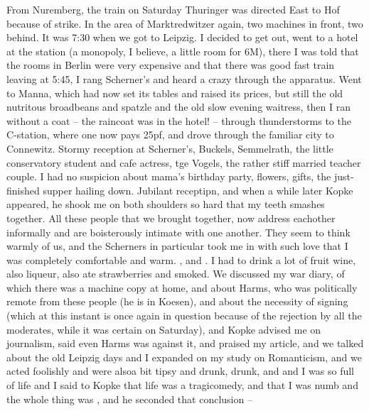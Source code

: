 From Nuremberg, the train on Saturday Thuringer was directed East to Hof because of strike. In the area of Marktredwitzer  again, two machines in front, two behind. It was 7:30 when we got to Leipzig. I decided to get out, went to a hotel at the station (a monopoly, I believe, a little room for 6M), there I was told that the rooms in Berlin were very expensive and that there was good fast train leaving at 5:45, I rang Scherner's and heard a crazy  through the apparatus. Went to Manna, which had now set its tables and raised its prices, but still the old nutritous broadbeans and spatzle and the old slow evening waitress, then I ran without a coat -- the raincoat was in the hotel! -- through thunderstorms to the C-station, where one now pays 25pf, and drove through the familiar city to Connewitz. Stormy reception at Scherner's, Buckels, Semmelrath, the little conservatory student and cafe actress, tge Vogels, the rather stiff married teacher couple. I had no suspicion about mama's birthday party, flowers, gifts, the just-finished supper hailing down. Jubilant receptipn, and when a while later Kopke appeared, he shook me on both shoulders so hard that my teeth smashes together. All these people that we brought together, now address eachother informally and are boisterously intimate with one another. They seem to think warmly  of us, and the Scherners in particular took me in with such love that I was completely comfortable and warm. , and . I had to drink a lot of fruit wine, also liqueur, also ate strawberries and smoked. We discussed my war diary, of which there was a machine copy at home, and about Harms, who was politically remote from these people (he is in Koesen), and about the necessity of signing (which at this instant is once again in question because of the rejection by all the moderates, while it was certain on Saturday), and Kopke advised me on journalism, said even Harms was against it, and praised my article, and we talked about the old Leipzig days and I expanded on my study on Romanticism, and we acted foolishly and were alsoa bit tipsy and drunk, drunk, and  and I was so full of life and I said to Kopke that life was a tragicomedy, and that I was numb and the whole thing was , and he seconded that conclusion -- 

